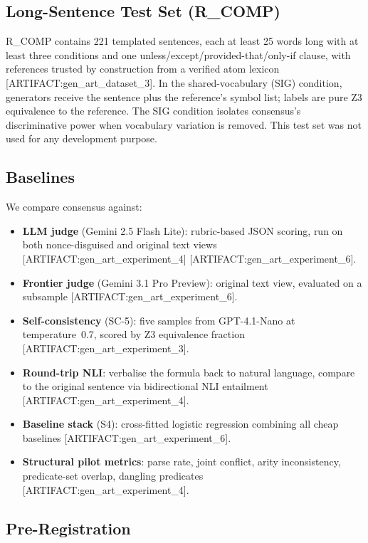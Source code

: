 \documentclass[11pt,letterpaper]{article}
\begin{document}
\subsection{Long-Sentence Test Set (R\_COMP)}
\label{sec:rcomp}

R\_COMP contains 221 templated sentences, each at least 25 words long with at least three conditions and one unless/except/provided-that/only-if clause, with references trusted by construction from a verified atom lexicon [ARTIFACT:gen\_art\_dataset\_3].
In the shared-vocabulary (SIG) condition, generators receive the sentence plus the reference's symbol list; labels are pure Z3 equivalence to the reference.
The SIG condition isolates consensus's discriminative power when vocabulary variation is removed.
This test set was not used for any development purpose.

\subsection{Baselines}
\label{sec:baselines}

We compare consensus against:
\begin{itemize}
\item \textbf{LLM judge} (Gemini 2.5 Flash Lite): rubric-based JSON scoring, run on both nonce-disguised and original text views [ARTIFACT:gen\_art\_experiment\_4] [ARTIFACT:gen\_art\_experiment\_6].
\item \textbf{Frontier judge} (Gemini 3.1 Pro Preview): original text view, evaluated on a subsample [ARTIFACT:gen\_art\_experiment\_6].
\item \textbf{Self-consistency} (SC-5): five samples from GPT-4.1-Nano at temperature~0.7, scored by Z3 equivalence fraction [ARTIFACT:gen\_art\_experiment\_3].
\item \textbf{Round-trip NLI}: verbalise the formula back to natural language, compare to the original sentence via bidirectional NLI entailment [ARTIFACT:gen\_art\_experiment\_4].
\item \textbf{Baseline stack} (S4): cross-fitted logistic regression combining all cheap baselines [ARTIFACT:gen\_art\_experiment\_6].
\item \textbf{Structural pilot metrics}: parse rate, joint conflict, arity inconsistency, predicate-set overlap, dangling predicates [ARTIFACT:gen\_art\_experiment\_4].
\end{itemize}

\subsection{Pre-Registration}
\label{sec:prereg}
\end{document}
